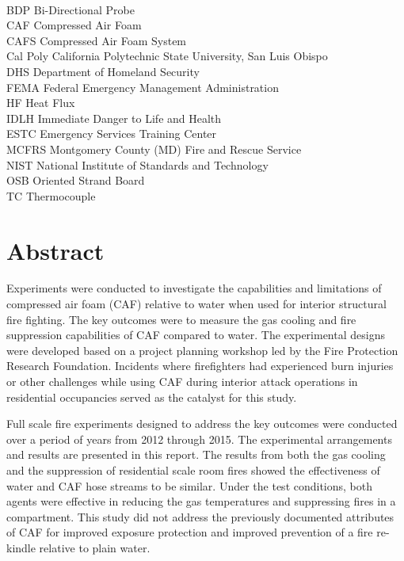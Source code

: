 \documentclass[12pt,oneside]{book}
\begin{document}
\begin{tabbing}
\hspace{1.5in} \= \\
BDP \> Bi-Directional Probe \\
CAF \> Compressed Air Foam \\
CAFS \> Compressed Air Foam System \\
Cal Poly \> California Polytechnic State University, San Luis Obispo \\
DHS \> Department of Homeland Security \\
FEMA \> Federal Emergency Management Administration \\
HF \> Heat Flux \\
IDLH \> Immediate Danger to Life and Health \\
ESTC \> Emergency Services Training Center \\
MCFRS \> Montgomery County (MD) Fire and Rescue Service \\
NIST \> National Institute of Standards and Technology \\
OSB \> Oriented Strand Board \\
TC \> Thermocouple \\

\end{tabbing}

\mainmatter

\chapter*{\centering Abstract}

Experiments were conducted to investigate the capabilities and limitations of compressed air foam (CAF) relative to water when used for interior structural fire fighting. The key outcomes were to measure the gas cooling and fire suppression capabilities of CAF compared to water. The experimental designs were developed based on a project planning workshop led by the Fire Protection Research Foundation. Incidents where firefighters had experienced burn injuries or other challenges while using CAF during interior attack operations in residential occupancies served as the catalyst for this study.

Full scale fire experiments designed to address the key outcomes were conducted over a period of years from 2012 through 2015. The experimental arrangements and results are presented in this report. The results from both the gas cooling and the suppression of residential scale room fires showed the effectiveness of water and CAF hose streams to be similar. Under the test conditions, both agents were effective in reducing the gas temperatures and suppressing fires in a compartment. This study did not address the previously documented attributes of CAF for improved exposure protection and improved prevention of a fire re-kindle relative to plain water. 
\end{document}
